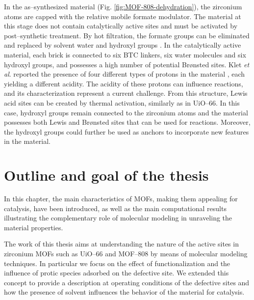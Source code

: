 In the as--synthesized material (Fig. \ref{fig:MOF-808-dehydration}), the zirconium atoms are capped with the relative mobile formate modulator. The material at this stage does not contain catalytically active sites and must be activated by post--synthetic treatment. By hot filtration, the formate groups can be eliminated and replaced by solvent water and hydroxyl groups \cite{plessers2016zr, mautschke2018catalytic}. In the catalytically active material, each brick is connected to six BTC linkers, six water molecules and six hydroxyl groups, and possesses a high number of potential Br\o{}nsted sites. Klet \textit{et al}. reported the presence of four different types of protons in the material \cite{klet2016evaluation}, each yielding a different acidity. The acidity of these protons can influence reactions, and its characterization represent a current challenge. From this structure, Lewis acid sites can be created by thermal activation, similarly as in UiO--66. In this case, hydroxyl groups remain connected to the zirconium atoms and the material possesses both Lewis and Br\o{}nsted sites that can be used for reactions. Moreover, the hydroxyl groups could further be used as anchors to incorporate new features in the material. 

\section{Outline and goal of the thesis}
In this chapter, the main characteristics of MOFs, making them appealing for catalysis, have been introduced, as well as the main computational results illustrating the complementary role of molecular modeling in unraveling the material properties. 

The work of this thesis aims at understanding the nature of the active sites in zirconium MOFs such as UiO--66 and MOF--808 by means of molecular modeling techniques. 
In particular we focus on the effect of functionalization and the influence of protic species adsorbed on the defective site. We extended this concept to provide a description at operating conditions of the defective sites and how the presence of solvent influences the behavior of the material for catalysis.\\


